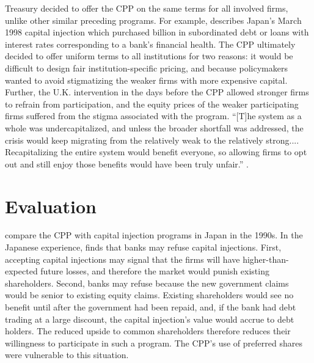 \documentclass[12pt]{article}
\begin{document}
Treasury decided to offer the CPP on the same terms for all involved firms, unlike other similar preceding programs. For example, \citet{Hoshi} describes Japan's March 1998 capital injection which purchased  billion in subordinated debt or loans with interest rates corresponding to a bank's financial health. The CPP ultimately decided to offer uniform terms to all institutions for two reasons: it would be difficult to design fair institution-specific pricing, and because policymakers wanted to avoid stigmatizing the weaker firms with more expensive capital. Further, the U.K. intervention in the days before the CPP allowed stronger firms to refrain from participation, and the equity prices of the weaker participating firms suffered from the stigma associated with the program. ``[T]he system as a whole was undercapitalized, and unless the broader shortfall was addressed, the crisis would keep migrating from the relatively weak to the relatively strong.... Recapitalizing the entire system would benefit everyone, so allowing firms to opt out and still enjoy those benefits would have been truly unfair.'' \citep{Geithner}.

\section{Evaluation}

\citet{Hoshi} compare the CPP with capital injection programs in Japan in the 1990s. In the Japanese experience, \citet{Hoshi} finds that banks may refuse capital injections. First, accepting capital injections may signal that the firms will have higher-than-expected future losses, and therefore the market would punish existing shareholders. Second, banks may refuse because the new government claims would be senior to existing equity claims. Existing shareholders would see no benefit until after the government had been repaid, and, if the bank had debt trading at a large discount, the capital injection's value would accrue to debt holders. The reduced upside to common shareholders therefore reduces their willingness to participate in such a program. The CPP's use of preferred shares were vulnerable to this situation. 
\end{document}
